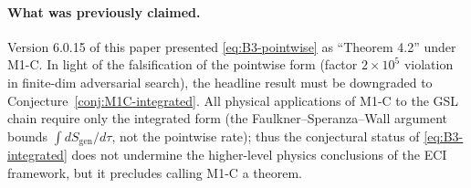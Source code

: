 \paragraph{What was previously claimed.}  Version 6.0.15 of this paper presented \eqref{eq:B3-pointwise} as ``Theorem 4.2'' under M1-C.  In light of the falsification of the pointwise form (factor $2\times 10^5$ violation in finite-dim adversarial search), the headline result must be downgraded to Conjecture~\ref{conj:M1C-integrated}.  All physical applications of M1-C to the GSL chain require only the integrated form (the Faulkner--Speranza--Wall argument bounds $\int dS_{\mathrm{gen}}/d\tau$, not the pointwise rate); thus the conjectural status of \eqref{eq:B3-integrated} does not undermine the higher-level physics conclusions of the ECI framework, but it precludes calling M1-C a theorem.

